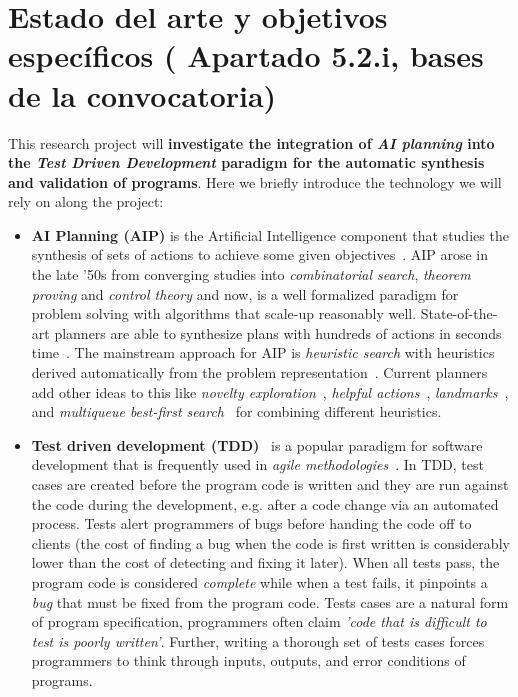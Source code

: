 \documentclass[10pt,a4paper]{paper}
\begin{document}
\newpage
\section{Estado del arte y objetivos específicos ( Apartado 5.2.i, bases de la convocatoria)}

This research project will {\bf investigate the integration of {\em AI planning} into the {\em Test Driven Development} paradigm for the automatic synthesis and validation of programs}. Here we briefly introduce the technology we will rely on along the project:
\begin{itemize}
\item {\bf AI Planning (AIP)} is the Artificial Intelligence component that studies the synthesis of sets of actions to achieve some given objectives~\cite{ghallab2004automated}. AIP arose in the late ’50s from converging studies into {\em combinatorial search}, {\em theorem proving} and {\em control theory} and now, is a well formalized paradigm for problem solving with algorithms that scale-up reasonably well. State-of-the-art planners are able to synthesize plans with hundreds of actions in seconds time~\cite{geffner2013concise}.  The mainstream approach for AIP is {\em heuristic search} with heuristics derived automatically from the problem representation~\cite{mcdermott1996heuristic,bonet2001planning}.  Current planners add other ideas to this like {\it novelty exploration}~\cite{geffner:psimulators:IJCAI17}, {\it helpful actions}~\cite{hoffmann2001ff}, {\it landmarks}~\cite{helmert2006fast}, and {\it multiqueue best-first search}~\cite{richter2010lama} for combining different heuristics.
  
\item {\bf Test driven development (TDD)}~\cite{beck:TDD:2003} is a popular paradigm for software development that is frequently used in {\it agile methodologies}~\cite{cohen2003agile}. In TDD, test cases are created before the program code is written and they are run against the code during the development, e.g. after a code change via an automated process. Tests alert programmers of bugs before handing the code off to clients (the cost of finding a bug when the code is first written is considerably lower than the cost of detecting and fixing it later). When all tests pass, the program code is considered {\em complete} while when a test fails, it pinpoints a {\em bug} that must be fixed from the program code. Tests cases are a natural form of program specification, programmers often claim {\em 'code that is difficult to test is poorly written'}. Further, writing a thorough set of tests cases forces programmers to think through inputs, outputs, and error conditions of programs. 
\end{itemize}
\end{document}
